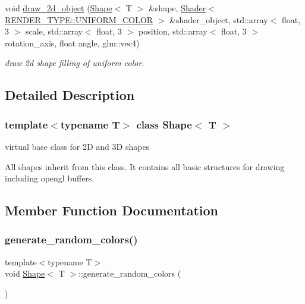 \begin{DoxyCompactItemize}
void \mbox{\hyperlink{classShape_aaff31c90cf40c78284454009c9fe0966}{draw\+\_\+2d\+\_\+object}} (\mbox{\hyperlink{classShape}{Shape}}$<$ T $>$ \&shape, \mbox{\hyperlink{classShader}{Shader}}$<$ \mbox{\hyperlink{render_8hpp_a24e288e18eb7b6e01de7565001fedb60aa98862073f71a928bad5099cc3e1c2ed}{R\+E\+N\+D\+E\+R\+\_\+\+T\+Y\+P\+E\+::\+U\+N\+I\+F\+O\+R\+M\+\_\+\+C\+O\+L\+OR}} $>$ \&shader\+\_\+object, std\+::array$<$ float, 3 $>$ scale, std\+::array$<$ float, 3 $>$ position, std\+::array$<$ float, 3 $>$ rotation\+\_\+axis, float angle, glm\+::vec4)
\begin{DoxyCompactList}\small\item\em draw 2d shape filling of uniform color. \end{DoxyCompactList}\end{DoxyCompactItemize}


\subsection{Detailed Description}
\subsubsection*{template$<$typename T$>$\newline
class Shape$<$ T $>$}

virtual base class for 2D and 3D shapes 

All shapes inherit from this class. It contains all basic structures for drawing including opengl buffers. 

\subsection{Member Function Documentation}
\mbox{\label{classShape_aabeb601fe95b412987d5b5c276bf8a7a}} 
\subsubsection{\texorpdfstring{generate\+\_\+random\+\_\+colors()}{generate\_random\_colors()}}
{\footnotesize\ttfamily template$<$typename T$>$ \\
void \mbox{\hyperlink{classShape}{Shape}}$<$ T $>$\+::generate\+\_\+random\+\_\+colors (\begin{DoxyParamCaption}{ }\end{DoxyParamCaption})\hspace{0.3cm}{\ttfamily [inline]}}



